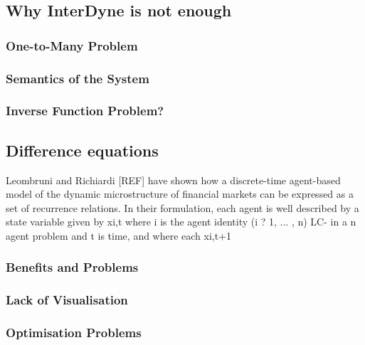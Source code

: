 \documentclass{article}
\begin{document}

\subsection{Why InterDyne is not enough}
%


\subsubsection{One-to-Many Problem}
\subsubsection{Semantics of the System} 
\subsubsection{Inverse Function Problem?} 

\subsection{Difference equations} 

Leombruni and Richiardi [REF] have shown how a discrete-time agent-based model of the dynamic microstructure of financial markets can be expressed as a set of recurrence relations.  In their formulation, each agent is well described by a state variable given by xi,t where i is the agent identity (i ? 1, ... , n) LC- in a n agent problem and t is time, and where each xi,t+1  

 \subsubsection{Benefits and Problems} 
 
 \subsubsection{Lack of Visualisation} 

\subsubsection{Optimisation Problems} 
\end{document}
